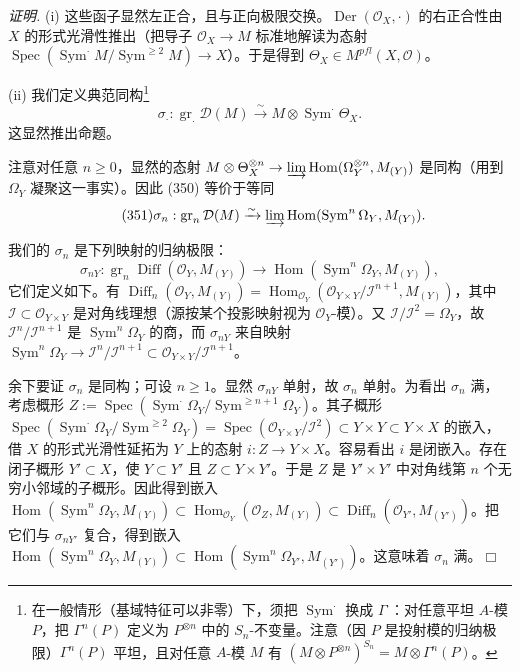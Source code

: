 \emph{证明.} (i) 这些函子显然左正合，且与正向极限交换。$\operatorname{Der}(\mathcal{O}_X,\cdot)$ 的右正合性由 $X$ 的形式光滑性推出（把导子 $\mathcal{O}_X\to M$ 标准地解读为态射 $\operatorname{Spec}(\operatorname{Sym}^\cdot M/\operatorname{Sym}^{\ge 2}M)\to X$）。于是得到 $\Theta_X\in M^{pfl}(X,\mathcal{O})$。

(ii) 我们定义典范同构\footnote{在一般情形（基域特征可以非零）下，须把 $\operatorname{Sym}^\cdot$ 换成 $\Gamma^\cdot$：对任意平坦 $A$-模 $P$，把 $\Gamma^n(P)$ 定义为 $P^{\otimes n}$ 中的 $S_n$-不变量。注意（因 $P$ 是投射模的归纳极限）$\Gamma^n(P)$ 平坦，且对任意 $A$-模 $M$ 有 $(M\otimes P^{\otimes n})^{S_n}=M\otimes\Gamma^n(P)$。}
\begin{equation}\tag{350}
\sigma_\cdot:\operatorname{gr}_\cdot\mathcal{D}(M)\xrightarrow{\sim}M\otimes\operatorname{Sym}^\cdot\Theta_X.
\end{equation}
这显然推出命题。

注意对任意 $n\ge 0$，显然的态射 $M\otimes\Theta_X^{\otimes n}\to\varinjlim\operatorname{Hom}(\Omega_Y^{\otimes n},M_{(Y)})$ 是同构（用到 $\Omega_Y$ 凝聚这一事实）。因此 (350) 等价于等同
\begin{equation}\tag{351}
\sigma_n:\operatorname{gr}_n\mathcal{D}(M)\xrightarrow{\sim}\varinjlim\operatorname{Hom}(\operatorname{Sym}^n\Omega_Y,M_{(Y)}).
\end{equation}


我们的 $\sigma_n$ 是下列映射的归纳极限：
\[
\sigma_{nY}:\operatorname{gr}_n\operatorname{Diff}(\mathcal{O}_Y,M_{(Y)})\to\operatorname{Hom}(\operatorname{Sym}^n\Omega_Y,M_{(Y)}),
\]
它们定义如下。有 $\operatorname{Diff}_n(\mathcal{O}_Y,M_{(Y)})=\operatorname{Hom}_{\mathcal{O}_Y}(\mathcal{O}_{Y\times Y}/\mathcal{I}^{n+1},M_{(Y)})$，其中 $\mathcal{I}\subset\mathcal{O}_{Y\times Y}$ 是对角线理想（源按某个投影映射视为 $\mathcal{O}_Y$-模）。又 $\mathcal{I}/\mathcal{I}^2=\Omega_Y$，故 $\mathcal{I}^n/\mathcal{I}^{n+1}$ 是 $\operatorname{Sym}^n\Omega_Y$ 的商，而 $\sigma_{nY}$ 来自映射 $\operatorname{Sym}^n\Omega_Y\to\mathcal{I}^n/\mathcal{I}^{n+1}\subset\mathcal{O}_{Y\times Y}/\mathcal{I}^{n+1}$。

余下要证 $\sigma_n$ 是同构；可设 $n\ge 1$。显然 $\sigma_{nY}$ 单射，故 $\sigma_n$ 单射。为看出 $\sigma_n$ 满，考虑概形 $Z:=\operatorname{Spec}(\operatorname{Sym}^\cdot\Omega_Y/\operatorname{Sym}^{\ge n+1}\Omega_Y)$。其子概形 $\operatorname{Spec}(\operatorname{Sym}^\cdot\Omega_Y/\operatorname{Sym}^{\ge 2}\Omega_Y)=\operatorname{Spec}(\mathcal{O}_{Y\times Y}/\mathcal{I}^2)\subset Y\times Y\subset Y\times X$ 的嵌入，借 $X$ 的形式光滑性延拓为 $Y$ 上的态射 $i:Z\to Y\times X$。容易看出 $i$ 是闭嵌入。存在闭子概形 $Y'\subset X$，使 $Y\subset Y'$ 且 $Z\subset Y\times Y'$。于是 $Z$ 是 $Y'\times Y'$ 中对角线第 $n$ 个无穷小邻域的子概形。因此得到嵌入 $\operatorname{Hom}(\operatorname{Sym}^n\Omega_Y,M_{(Y)})\subset\operatorname{Hom}_{\mathcal{O}_Y}(\mathcal{O}_Z,M_{(Y)})\subset\operatorname{Diff}_n(\mathcal{O}_{Y'},M_{(Y')})$。把它们与 $\sigma_{nY'}$ 复合，得到嵌入 $\operatorname{Hom}(\operatorname{Sym}^n\Omega_Y,M_{(Y)})\subset\operatorname{Hom}(\operatorname{Sym}^n\Omega_{Y'},M_{(Y')})$。这意味着 $\sigma_n$ 满。\hfill$\Box$

